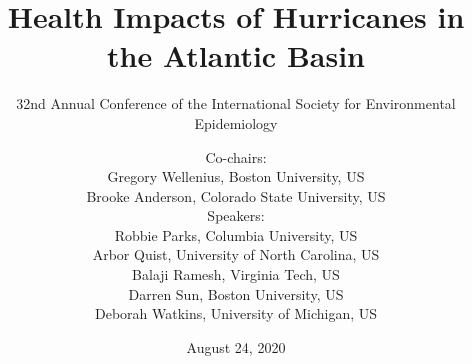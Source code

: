 \usepackage{booktabs}
\usepackage{array}
\usepackage{colortbl}
\usepackage[british]{babel}
\usepackage{graphicx,hyperref,url}
\usepackage{fontawesome}
\usepackage{hyperref}
\usepackage{adjustbox}
\usepackage{appendixnumberbeamer}
\hypersetup{colorlinks=true,allcolors=blue}

\title{Health Impacts of Hurricanes in the Atlantic Basin}
\subtitle{32nd Annual Conference of the International Society for Environmental Epidemiology}
\date{August 24, 2020}

\author{
  Co-chairs: \\
  Gregory Wellenius, Boston University, US \\ 
  Brooke Anderson, Colorado State University, US \\[0.5cm]
  Speakers: \\
  Robbie Parks, Columbia University, US \\
  Arbor Quist, University of North Carolina, US \\
  Balaji Ramesh, Virginia Tech, US \\
  Darren Sun, Boston University, US \\
  Deborah Watkins, University of Michigan, US
  }


